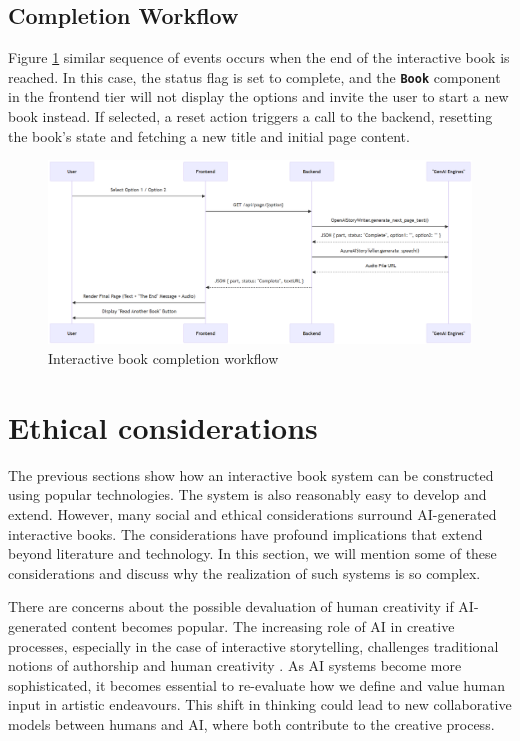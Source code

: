 \documentclass[conference]{IEEEtran}
\begin{document}
	
	\subsection{Completion Workflow}
	
	Figure \ref{fig:img-ari3333-completion-workflow} similar sequence of events occurs when the end of the interactive book is reached. In this case, the status flag is set to complete, and the \textbf{\texttt{Book}} component in the frontend tier will not display the options and invite the user to start a new book instead. If selected, a reset action triggers a call to the backend, resetting the book's state and fetching a new title and initial page content.
	
	\begin{figure}[H]
		\centering
		\includegraphics[width=0.7\linewidth]{img/img-ARI3333-completion-workflow}
		\caption{Interactive book completion workflow}
		\label{fig:img-ari3333-completion-workflow}
	\end{figure}
	
	
	\section{Ethical considerations}
		
	The previous sections show how an interactive book system can be constructed using popular technologies. The system is also reasonably easy to develop and extend. However, many social and ethical considerations surround AI-generated interactive books. The considerations have profound implications that extend beyond literature and technology. In this section, we will mention some of these considerations and discuss why the realization of such systems is so complex.
	
	There are concerns about the possible devaluation of human creativity if AI-generated content becomes popular. The increasing role of AI in creative processes, especially in the case of interactive storytelling, challenges traditional notions of authorship and human creativity \cite{udhayakumarexploring}. As AI systems become more sophisticated, it becomes essential to re-evaluate how we define and value human input in artistic endeavours. This shift in thinking could lead to new collaborative models between humans and AI, where both contribute to the creative process\cite{udhayakumarexploring}.
	
\end{document}
